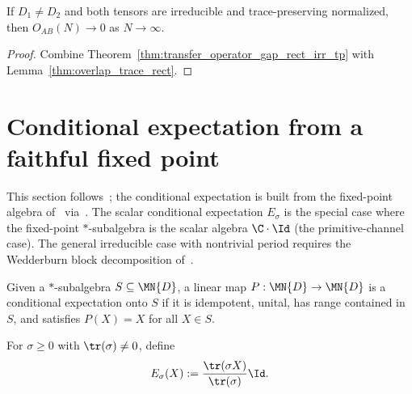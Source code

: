 \begin{theorem}%
    \label{thm:overlap_decay_rect_irr_tp}
    \leanok
    If $D_1 \neq D_2$ and both tensors are irreducible and
    trace-preserving normalized, then
    $O_{AB}(N) \to 0$ as $N \to \infty$.
\end{theorem}

\begin{proof}\leanok{}
    Combine
    Theorem~\ref{thm:transfer_operator_gap_rect_irr_tp} with
    Lemma~\ref{thm:overlap_trace_rect}.
\end{proof}

\section{Conditional expectation from a faithful fixed point}

This section follows~\cite[Section~6.4]{Wolf2012Quantum}; the conditional
expectation is built from the fixed-point algebra of~\cite[Theorem~6.14]{Wolf2012Quantum}
via~\cite[(1.40)]{Wolf2012Quantum}.
The scalar conditional expectation $E_\sigma$ is the special case where
the fixed-point $*$-subalgebra is the scalar algebra $\C\cdot\Id$
(the primitive-channel case). The general irreducible case with
nontrivial period requires the Wedderburn block decomposition
of~\cite[Theorem~6.14]{Wolf2012Quantum}.

\begin{definition}\label{def:is_conditional_expectation}
    \leanok
    Given a $*$-subalgebra $S \subseteq \MN{D}$, a linear map
    $P : \MN{D} \to \MN{D}$ is a conditional expectation onto $S$ if it is
    idempotent, unital, has range contained in $S$, and satisfies
    $P(X)=X$ for all $X \in S$.
\end{definition}

\begin{definition}\label{def:scalar_conditional_expectation}
    \leanok
    For $\sigma \ge 0$ with $\tr(\sigma)\neq 0$, define
    \[
        E_\sigma(X) := \frac{\tr(\sigma X)}{\tr(\sigma)} \Id.
    \]
\end{definition}

